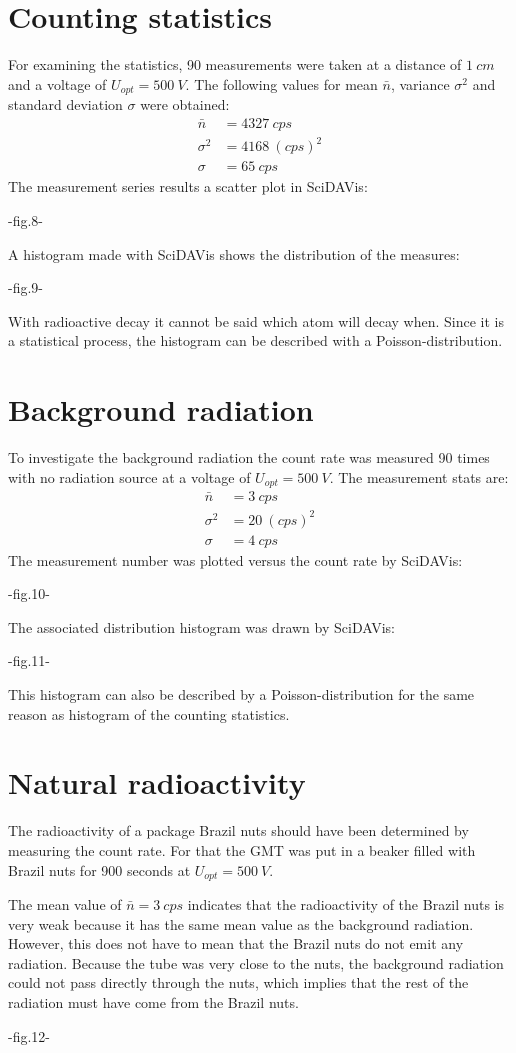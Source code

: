 \section{Counting statistics}
%
For examining the statistics, 90 measurements were taken at a distance of \( \SI{1}{cm} \) and a voltage of
\( U_{opt}=\SI{500}{V} \). The following values for mean \( \bar{n} \), variance \( \sigma^{2} \) and standard deviation
\( \sigma \) were obtained:
%
\begin{align}
    \bar{n}     &=  \SI{4327}{cps} \\
    \sigma^{2}  &=  \SI{4168}{(cps)^{2}} \\
    \sigma      &=  \SI{65}{cps}
\end{align}
The measurement series results a scatter plot in SciDAVis:\par
-fig.8-\par
A histogram made with SciDAVis shows the distribution of the measures:\par
-fig.9-\par
With radioactive decay it cannot be said which atom will decay when. Since it is a statistical process, the histogram
can be described with a Poisson-distribution.
%
\section{Background radiation}
%
To investigate the background radiation the count rate was measured 90 times with no radiation source at a voltage of
\( U_{opt}=\SI{500}{V} \). The measurement stats are:
%
\begin{align}
    \bar{n}     &=  \SI{3}{cps} \\
    \sigma^{2}  &=  \SI{20}{(cps)^{2}} \\
    \sigma      &=  \SI{4}{cps}
\end{align}
The measurement number was plotted versus the count rate by SciDAVis:\par
-fig.10-\par
The associated distribution histogram was drawn by SciDAVis:\par
-fig.11-\par
This histogram can also be described by a Poisson-distribution for the same reason as histogram of the counting
statistics.
%
\section{Natural radioactivity}
%
The radioactivity of a package Brazil nuts should have been determined by measuring the count rate. For that the GMT was
put in a beaker filled with Brazil nuts for 900 seconds at \( U_{opt}=\SI{500}{V} \).\par
The mean value of \( \bar{n}=\SI{3}{cps} \) indicates that the radioactivity of the Brazil nuts is very weak because it
has the same mean value as the background radiation. However, this does not have to mean that the Brazil nuts do not emit
any radiation. Because the tube was very close to the nuts, the background radiation could not pass directly through the
nuts, which implies that the rest of the radiation must have come from the Brazil nuts.\par
-fig.12-
